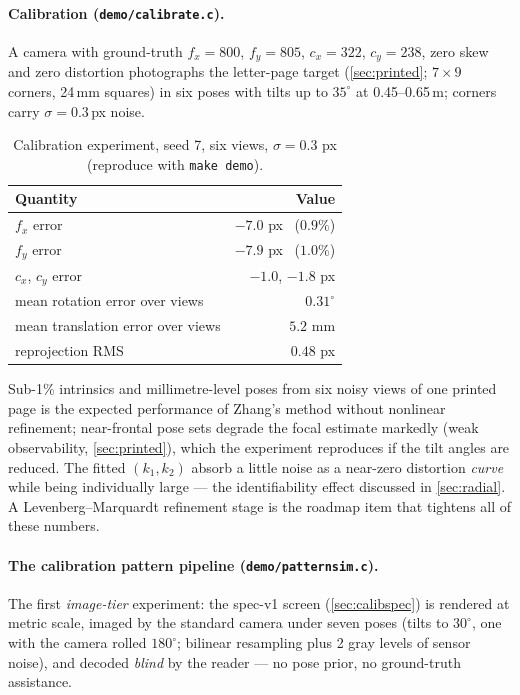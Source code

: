 \documentclass[11pt]{article}
\theoremstyle{definition}
\newcommand{\code}[1]{\texttt{#1}}
\begin{document}
\paragraph{Calibration (\code{demo/calibrate.c}).} A camera with
ground-truth $f_x=800$, $f_y=805$, $c_x=322$, $c_y=238$, zero skew
and zero distortion photographs the letter-page target
(\autoref{sec:printed}; $7\times9$ corners, 24\,mm squares) in six poses
with tilts up to $35^\circ$ at 0.45--0.65\,m; corners carry
$\sigma=0.3$\,px noise.

\begin{table}[ht]
\centering
\begin{tabular}{lr}
\toprule
Quantity & Value \\
\midrule
$f_x$ error   & $-7.0$ px \ ($0.9\%$) \\
$f_y$ error   & $-7.9$ px \ ($1.0\%$) \\
$c_x$, $c_y$ error & $-1.0$, $-1.8$ px \\
mean rotation error over views    & $0.31^\circ$ \\
mean translation error over views & $5.2$ mm \\
reprojection RMS                  & $0.48$ px \\
\bottomrule
\end{tabular}
\caption{Calibration experiment, seed 7, six views, $\sigma=0.3$ px
(reproduce with \code{make demo}).}
\label{tab:calibresults}
\end{table}

Sub-1\% intrinsics and millimetre-level poses from six noisy views of one
printed page is the expected performance of Zhang's method without
nonlinear refinement; near-frontal pose sets degrade the focal estimate
markedly (weak observability, \autoref{sec:printed}), which the experiment
reproduces if the tilt angles are reduced. The fitted $(k_1,k_2)$ absorb a
little noise as a near-zero distortion \emph{curve} while being individually
large --- the identifiability effect discussed in \autoref{sec:radial}. A
Levenberg--Marquardt refinement stage is the roadmap item that tightens all
of these numbers.

\paragraph{The calibration pattern pipeline
(\code{demo/patternsim.c}).} The first \emph{image-tier} experiment:
the spec-v1 screen (\autoref{sec:calibspec}) is rendered at metric
scale, imaged by the standard camera under seven poses (tilts to
$30^\circ$, one with the camera rolled $180^\circ$; bilinear resampling
plus 2 gray levels of sensor noise), and decoded \emph{blind} by the
reader --- no pose prior, no ground-truth assistance.
\end{document}
